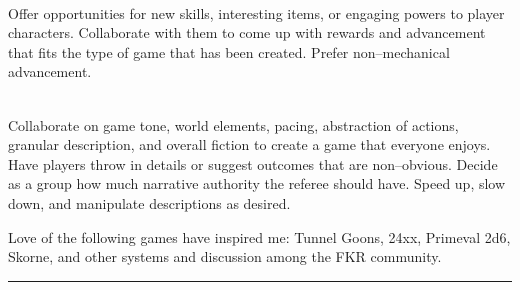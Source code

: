 \documentclass{article}
\begin{document}
\begin{multicols}{2}
   \\
  
  Offer opportunities for new skills, interesting items, or engaging powers to player characters.
  Collaborate with them to come up with rewards and advancement that fits the type of game that has been created.
  Prefer non--mechanical advancement.

   \\

  Collaborate on game tone, world elements, pacing, abstraction of actions, granular description, and overall fiction to create a game that everyone enjoys.
  Have players throw in details or suggest outcomes that are non--obvious.
  Decide as a group how much narrative authority the referee should have.
  Speed up, slow down, and manipulate descriptions as desired.


  Love of the following games have inspired me: Tunnel Goons, 24xx, Primeval 2d6, Skorne, and other systems and discussion among the FKR community.

  


\end{multicols} \hrule
 \vfill
\end{document}
